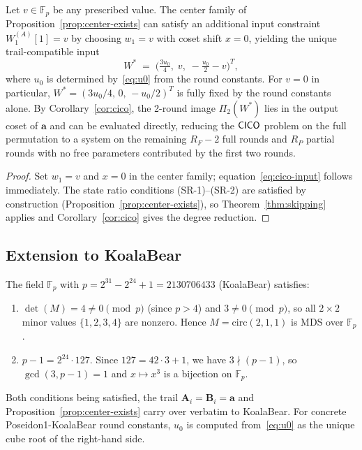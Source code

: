 \documentclass[11pt]{article}
\begin{document}
\begin{proposition}\label{prop:cico-coord1}
    Let $v\in\mathbb{F}_p$ be any prescribed value.
    The center family of Proposition~\ref{prop:center-exists} can satisfy an
    additional input constraint $W_1^{(A)}[1]=v$ by choosing $w_1=v$ with
    coset shift $x=0$, yielding the unique trail-compatible input
    \begin{equation}\label{eq:cico-input}
        W^* \;=\; \bigl(\tfrac{3u_0}{4},\; v,\; -\tfrac{u_0}{2} - v\bigr)^T,
    \end{equation}
    where $u_0$ is determined by~\eqref{eq:u0} from the round constants.
    For $v=0$ in particular, $W^* = (3u_0/4,\, 0,\, -u_0/2)^T$ is fully
    fixed by the round constants alone.
    By Corollary~\ref{cor:cico}, the 2-round image $\Pi_2(W^*)$ lies in
    the output coset of $\mathbf{a}$ and can be evaluated directly, reducing
    the $\mathsf{CICO}$ problem on the full permutation to a system on the remaining
    $R_F - 2$ full rounds and $R_P$ partial rounds with no free parameters
    contributed by the first two rounds.
\end{proposition}
\begin{proof}
    Set $w_1=v$ and $x=0$ in the center family; equation~\eqref{eq:cico-input}
    follows immediately.  The state ratio conditions (SR-1)--(SR-2) are
    satisfied by construction (Proposition~\ref{prop:center-exists}), so
    Theorem~\ref{thm:skipping} applies and Corollary~\ref{cor:cico} gives
    the degree reduction.
\end{proof}

\subsection{Extension to KoalaBear}\label{sec:koalabear-circ3}

The field $\mathbb{F}_p$ with $p=2^{31}-2^{24}+1=2130706433$ (KoalaBear) satisfies:
\begin{enumerate}
    \item $\det(M)=4\neq 0\pmod{p}$ (since $p>4$) and $3\neq 0\pmod{p}$,
          so all $2\times 2$ minor values $\{1,2,3,4\}$ are nonzero.
          Hence $M=\mathrm{circ}(2,1,1)$ is MDS over $\mathbb{F}_p$. \checkmark
    \item $p-1=2^{24}\cdot 127$.  Since $127=42\cdot 3+1$, we have $3\nmid(p-1)$,
          so $\gcd(3,p-1)=1$ and $x\mapsto x^3$ is a bijection on $\mathbb{F}_p$. \checkmark
\end{enumerate}
Both conditions being satisfied, the trail $\mathbf{A}_i=\mathbf{B}_i=\mathbf{a}$
and Proposition~\ref{prop:center-exists} carry over verbatim to KoalaBear.
For concrete Poseidon1-KoalaBear round constants, $u_0$ is computed
from~\eqref{eq:u0} as the unique cube root of the right-hand side.
\end{document}
